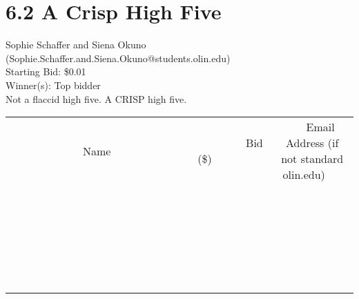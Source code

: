 \documentclass[11pt]{article}
\begin{document}
\section*{6.2 A Crisp High Five}
Sophie Schaffer and Siena Okuno (Sophie.Schaffer.and.Siena.Okuno@students.olin.edu) \\
Starting Bid: \$0.01 \\
Winner(s): 
Top bidder \\
Not a flaccid high five. A CRISP high five. \\[6ex]
\begin{tabular}{c c c}
~~~~~~~~~~~~~Name~~~~~~~~~~~~~ & ~~~~~~~~~Bid (\$)~~~~~~~~~ & ~~~Email Address (if not standard olin.edu)~~~ \\
 & & \\
\hline
 & & \\
\hline
 & & \\
\hline
 & & \\
\hline
 & & \\
\hline
 & & \\
\hline
 & & \\
\hline
 & & \\
\hline
 & & \\
\hline
 & & \\
\hline
 & & \\
\hline
 & & \\
\hline
 & & \\
\hline
 & & \\
\hline
 & & \\
\hline
 & & \\
\hline
 & & \\
\hline
 & & \\
\hline
 & & \\
\hline
 & & \\
\hline
 & & \\
\hline
 & & \\
\hline
 & & \\
\hline
 & & \\
\hline
 & & \\
\hline
 & & \\
\hline
\end{tabular}
\clearpage
\end{document}
